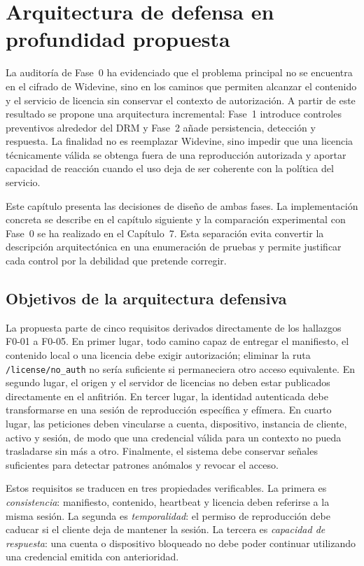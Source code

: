 
\chapter{Arquitectura de defensa en profundidad propuesta}

La auditoría de Fase~0 ha evidenciado que el problema principal no se encuentra en el cifrado de Widevine, sino en los caminos que permiten alcanzar el contenido y el servicio de licencia sin conservar el contexto de autorización. A partir de este resultado se propone una arquitectura incremental: Fase~1 introduce controles preventivos alrededor del DRM y Fase~2 añade persistencia, detección y respuesta. La finalidad no es reemplazar Widevine, sino impedir que una licencia técnicamente válida se obtenga fuera de una reproducción autorizada y aportar capacidad de reacción cuando el uso deja de ser coherente con la política del servicio.

Este capítulo presenta las decisiones de diseño de ambas fases. La implementación concreta se describe en el capítulo siguiente y la comparación experimental con Fase~0 se ha realizado en el Capítulo~7. Esta separación evita convertir la descripción arquitectónica en una enumeración de pruebas y permite justificar cada control por la debilidad que pretende corregir.

\section{Objetivos de la arquitectura defensiva}

La propuesta parte de cinco requisitos derivados directamente de los hallazgos F0-01 a F0-05. En primer lugar, todo camino capaz de entregar el manifiesto, el contenido local o una licencia debe exigir autorización; eliminar la ruta \nolinkurl{/license/no_auth} no sería suficiente si permaneciera otro acceso equivalente. En segundo lugar, el origen y el servidor de licencias no deben estar publicados directamente en el anfitrión. En tercer lugar, la identidad autenticada debe transformarse en una sesión de reproducción específica y efímera. En cuarto lugar, las peticiones deben vincularse a cuenta, dispositivo, instancia de cliente, activo y sesión, de modo que una credencial válida para un contexto no pueda trasladarse sin más a otro. Finalmente, el sistema debe conservar señales suficientes para detectar patrones anómalos y revocar el acceso.

Estos requisitos se traducen en tres propiedades verificables. La primera es \emph{consistencia}: manifiesto, contenido, heartbeat y licencia deben referirse a la misma sesión. La segunda es \emph{temporalidad}: el permiso de reproducción debe caducar si el cliente deja de mantener la sesión. La tercera es \emph{capacidad de respuesta}: una cuenta o dispositivo bloqueado no debe poder continuar utilizando una credencial emitida con anterioridad.

